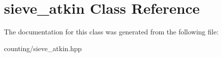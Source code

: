 \hypertarget{classsieve__atkin}{}\section{sieve\+\_\+atkin Class Reference}
\label{classsieve__atkin}


The documentation for this class was generated from the following file\+:\begin{DoxyCompactItemize}
\item 
counting/sieve\+\_\+atkin.\+hpp\end{DoxyCompactItemize}
